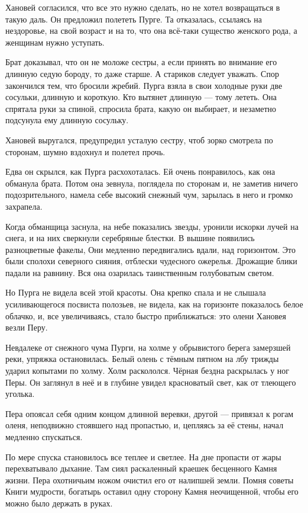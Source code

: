 \documentclass[oneside,final,14pt]{extreport}
\begin{document}
	Хановей согласился, что все это нужно сделать, но не хотел возвращаться в такую даль. Он предложил полететь Пурге. Та отказалась, ссылаясь на нездоровье, на свой возраст и на то, что она всё-таки существо женского рода, а женщинам нужно уступать.
	
	Брат доказывал, что он не моложе сестры, а если принять во внимание его длинную седую бороду, то даже старше. А стариков следует уважать. Спор закончился тем, что бросили жребий. Пурга взяла в свои холодные руки две сосульки, длинную и короткую. Кто вытянет длинную — тому лететь. Она спрятала руки за спиной, спросила брата, какую он выбирает, и незаметно подсунула ему длинную сосульку.
	
	Хановей выругался, предупредил усталую сестру, чтоб зорко смотрела по сторонам, шумно вздохнул и полетел прочь.
	
	Едва он скрылся, как Пурга расхохоталась. Ей очень понравилось, как она обманула брата. Потом она зевнула, поглядела по сторонам и, не заметив ничего подозрительного, намела себе высокий снежный чум, зарылась в него и громко захрапела.
	
	Когда обманщица заснула, на небе показались звезды, уронили искорки лучей на снега, и на них сверкнули серебряные блестки. В вышине появились разноцветные факелы, Они медленно передвигались вдали, над горизонтом. Это были сполохи северного сияния, отблески чудесного ожерелья. Дрожащие блики падали на равнину. Вся она озарилась таинственным голубоватым светом.
	
	Но Пурга не видела всей этой красоты. Она крепко спала и не слышала усиливающегося посвиста полозьев, не видела, как на горизонте показалось белое облачко, и, все увеличиваясь, стало быстро приближаться: это олени Хановея везли Перу.
	
	Невдалеке от снежного чума Пурги, на холме у обрывистого берега замерзшей реки, упряжка остановилась. Белый олень с тёмным пятном на лбу трижды ударил копытами по холму. Холм раскололся. Чёрная бездна раскрылась у ног Перы. Он заглянул в неё и в глубине увидел красноватый свет, как от тлеющего уголька.
	
	Пера опоясал себя одним концом длинной веревки, другой — привязал к рогам оленя, неподвижно стоявшего над пропастью, и, цепляясь за её стены, начал медленно спускаться.
	
	По мере спуска становилось все теплее и светлее. На дне пропасти от жары перехватывало дыхание. Там сиял раскаленный краешек бесценного Камня жизни. Пера охотничьим ножом очистил его от налипшей земли. Помня советы Книги мудрости, богатырь оставил одну сторону Камня неочищенной, чтобы его можно было держать в руках.
	
\end{document}
